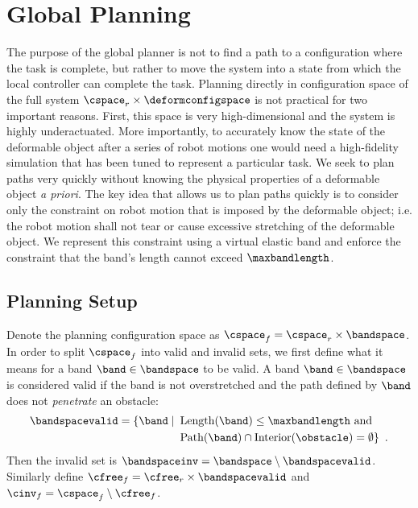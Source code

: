 \section{Global Planning}
\label{sec:global_planning}

The purpose of the global planner is not to find a path to a configuration where the task is complete, but rather to move the system into a state from which the local controller can complete the task. Planning directly in configuration space of the full system $\cspace_r \times \deformconfigspace$ is not practical for two important reasons. First, this space is very high-dimensional and the system is highly underactuated. More importantly, to accurately know the state of the deformable object after a series of robot motions one would need a high-fidelity simulation that has been tuned to represent a particular task. We seek to plan paths very quickly without knowing the physical properties of a deformable object \textit{a priori}. The key idea that allows us to plan paths quickly is to consider only the constraint on robot motion that is imposed by the deformable object; i.e. the robot motion shall not tear or cause excessive stretching of the deformable object. We represent this constraint using a virtual elastic band and enforce the constraint that the band's length cannot exceed $\maxbandlength$.


\subsection{Planning Setup}


Denote the planning configuration space as $\cspace_f = \cspace_r \times \bandspace$. In order to split $\cspace_f$ into valid and invalid sets, we first define what it means for a band $\band \in \bandspace$ to be valid. A band $\band \in \bandspace$ is considered valid if the band is not overstretched and the path defined by $\band$ does not \textit{penetrate} an obstacle:
\begin{equation}
\begin{split}
    \bandspacevalid = \{ \band \mid \enspace &\textrm{Length}(\band) \leq \maxbandlength \textrm{ and } \\
                                             &\textrm{Path(\band)} \cap \textrm{Interior}(\obstacle) = \emptyset \} \enspace .
\end{split}
\end{equation}
Then the invalid set is $\bandspaceinv = \bandspace \setminus \bandspacevalid$. Similarly define $\cfree_f = \cfree_r \times \bandspacevalid$ and $\cinv_f = \cspace_f \setminus \cfree_f$.




